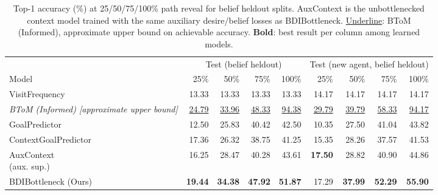 \begin{table}[!htbp]
  \centering
  \scriptsize
  \setlength{\tabcolsep}{2.5pt}
  \caption{Top-1 accuracy (\%) at 25/50/75/100\% path reveal for belief heldout splits. AuxContext is the unbottlenecked context model trained with the same auxiliary desire/belief losses as BDIBottleneck. \underline{Underline}: BToM (Informed), approximate upper bound on achievable accuracy. \textbf{Bold}: best result per column among learned models.}
  \label{tab:goal_inference_top1_quarters_bh}
  \begin{tabular}{lrrrrrrrr}
    \toprule
    & \multicolumn{4}{c}{Test (belief heldout)} & \multicolumn{4}{c}{Test (new agent, belief heldout)} \\
    \cmidrule(lr){2-5} \cmidrule(lr){6-9}
    Model & 25\% & 50\% & 75\% & 100\% & 25\% & 50\% & 75\% & 100\% \\
    \midrule
    VisitFrequency & 13.33 & 13.33 & 13.33 & 13.33 & 14.17 & 14.17 & 14.17 & 14.17 \\
    \textit{BToM (Informed) [approximate upper bound]} & \underline{24.79} & \underline{33.96} & \underline{48.33} & \underline{94.38} & \underline{29.79} & \underline{39.79} & \underline{58.33} & \underline{94.17} \\
    GoalPredictor & 12.50 & 25.83 & 40.42 & 42.50 & 10.35 & 27.50 & 41.04 & 43.82 \\
    ContextGoalPredictor & 17.36 & 26.32 & 38.75 & 41.25 & 15.35 & 28.26 & 37.57 & 41.53 \\
    \shortstack[l]{AuxContext\\(aux. sup.)} & 16.25 & 28.47 & 40.28 & 43.61 & \textbf{17.50} & 28.82 & 40.90 & 44.86 \\
    BDIBottleneck (Ours) & \textbf{19.44} & \textbf{34.38} & \textbf{47.92} & \textbf{51.87} & 17.29 & \textbf{37.99} & \textbf{52.29} & \textbf{55.90} \\
    \bottomrule
  \end{tabular}
\end{table}
